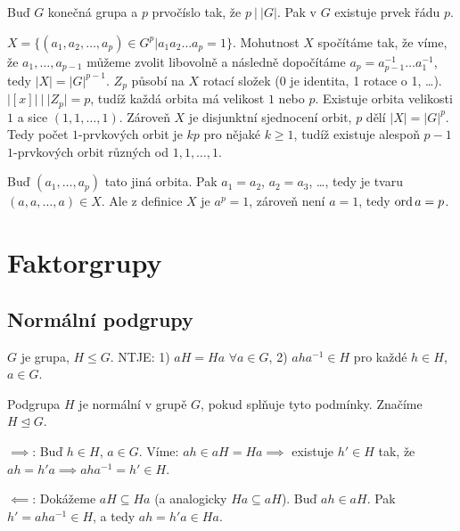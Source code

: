 \documentclass[12pt]{article}                   %
\begin{document}
        \begin{veta}[Cauchyova]
            Buď $G$ konečná grupa a $p$ prvočíslo tak, že $p\ |\ |G|$. Pak v $G$ existuje prvek řádu $p$.

            \begin{dukazin}
                $X = \{(a_1, a_2, …, a_p) \in G^{p} | a_1a_2…a_p = 1\}$. Mohutnost $X$ spočítáme tak, že víme, že $a_1, …, a_{p-1}$ můžeme zvolit libovolně a následně dopočítáme $a_p = a_{p-1}^{-1}…a_1^{-1}$, tedy $|X| = |G|^{p-1}$. $Z_p$ působí na $X$ rotací složek (0 je identita, 1 rotace o 1, …). $|[x]|\ |\ |Z_p| = p$, tudíž každá orbita má velikost $1$ nebo $p$. Existuje orbita velikosti $1$ a sice $(1, 1, …, 1)$. Zároveň $X$ je disjunktní sjednocení orbit, $p$ dělí $|X| = |G|^p$. Tedy počet $1$-prvkových orbit je $kp$ pro nějaké $k ≥ 1$, tudíž existuje alespoň $p-1$ $1$-prvkových orbit různých od $1, 1, …, 1$.

                Buď $(a_1, …, a_p)$ tato jiná orbita. Pak $a_1 = a_2$, $a_2 = a_3$, …, tedy je tvaru $(a, a, …, a) \in X$. Ale z definice $X$ je $a^p = 1$, zároveň není $a = 1$, tedy $\operatorname{ord} a = p$.
            \end{dukazin}
        \end{veta}

\section{Faktorgrupy}
    \subsection{Normální podgrupy}
        \begin{tvrzeni}
            $G$ je grupa, $H ≤ G$. NTJE:
            1) $aH = Ha$ $\forall a \in G$,
            2) $aha^{-1} \in H$ pro každé $h \in H$, $a \in G$.
        \end{tvrzeni}

        \begin{definicein}
            Podgrupa $H$ je normální v grupě $G$, pokud splňuje tyto podmínky. Značíme $H \trianglelefteq G$.
        \end{definicein}

        \begin{dukazin}
            $\implies$: Buď $h \in H$, $a \in G$. Víme: $ah \in aH = Ha \implies$ existuje $h' \in H$ tak, že $ah = h'a \implies aha^{-1} = h' \in H$.

            $\impliedby$: Dokážeme $aH \subseteq Ha$ (a analogicky $Ha \subseteq aH$). Buď $ah \in aH$. Pak $h' = aha^{-1} \in H$, a tedy $ah = h'a \in Ha$.
        \end{dukazin}
\end{document}
